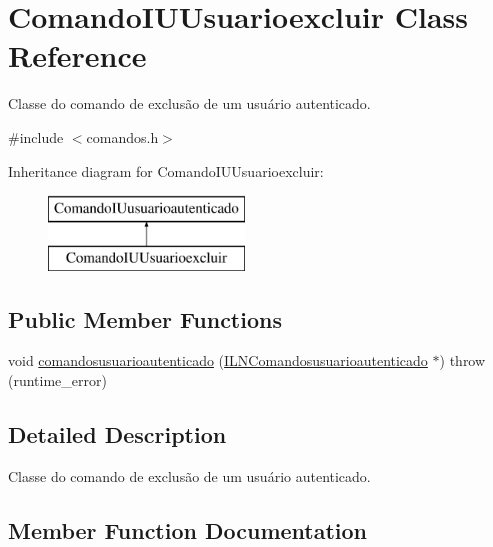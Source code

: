 \hypertarget{classComandoIUUsuarioexcluir}{}\section{Comando\+I\+U\+Usuarioexcluir Class Reference}
\label{classComandoIUUsuarioexcluir}


Classe do comando de exclusão de um usuário autenticado.  




{\ttfamily \#include $<$comandos.\+h$>$}

Inheritance diagram for Comando\+I\+U\+Usuarioexcluir\+:\begin{figure}[H]
\begin{center}
\leavevmode
\includegraphics[height=2.000000cm]{classComandoIUUsuarioexcluir}
\end{center}
\end{figure}
\subsection*{Public Member Functions}
\begin{DoxyCompactItemize}
\item 
void \hyperlink{classComandoIUUsuarioexcluir_a891b23e41ec18031eb81f978796a7163}{comandosusuarioautenticado} (\hyperlink{classILNComandosusuarioautenticado}{I\+L\+N\+Comandosusuarioautenticado} $\ast$)  throw (runtime\+\_\+error)
\end{DoxyCompactItemize}


\subsection{Detailed Description}
Classe do comando de exclusão de um usuário autenticado. 

\subsection{Member Function Documentation}
\mbox{\label{classComandoIUUsuarioexcluir_a891b23e41ec18031eb81f978796a7163}} 
